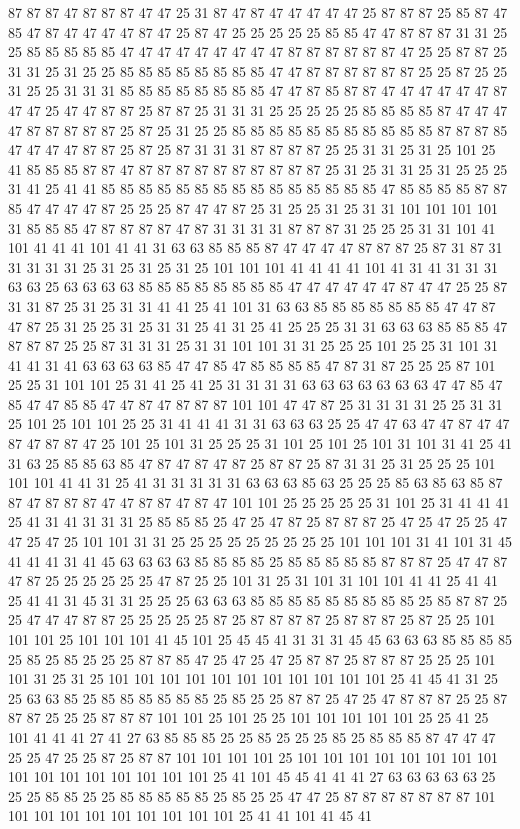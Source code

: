 87 87 87 47 87 87 87 47 47 25 31 87 47 87 47 47 47 47 47 25 87 87 87 25 85 87 47 85 47 87 47 47 47 47 87 47 25 87 47 25 25 25 25 25 85 85 47 47 87 87 87 31 31 25 25 85 85 85 85 85 47 47 47 47 47 47 47 47 47 87 87 87 87 87 87 47 25 25 87 87 25 31 31 25 31 25 25 85 85 85 85 85 85 85 85 47 47 87 87 87 87 87 87 25 25 87 25 25 31 25 25 31 31 31 85 85 85 85 85 85 85 85 47 47 87 85 87 87 47 47 47 47 47 47 87 47 47 25 47 47 87 87 25 87 87 25 31 31 31 25 25 25 25 25 85 85 85 85 87 47 47 47 47 87 87 87 87 87 25 87 25 31 25 25 85 85 85 85 85 85 85 85 85 85 85 87 87 87 85 47 47 47 47 87 87 25 87 25 87 31 31 31 87 87 87 87 25 25 31 31 25 31 25 101 25 41 85 85 85 87 87 47 87 87 87 87 87 87 87 87 87 87 25 31 25 31 31 25 31 25 25 25 31 41 25 41 41 85 85 85 85 85 85 85 85 85 85 85 85 85 85 85 47 85 85 85 85 87 87 85 47 47 47 47 87 25 25 25 87 47 47 87 25 31 25 25 31 25 31 31 101 101 101 101 31 85 85 85 47 87 87 87 87 47 87 31 31 31 31 87 87 87 31 25 25 25 31 31 101 41 101 41 41 41 101 41 41 31 63 63 85 85 85 87 47 47 47 47 87 87 87 25 87 31 87 31 31 31 31 31 25 31 25 31 25 31 25 101 101 101 41 41 41 41 101 41 31 41 31 31 31 63 63 25 63 63 63 63 85 85 85 85 85 85 85 85 47 47 47 47 47 47 87 47 47 25 25 87 31 31 87 25 31 25 31 31 41 41 25 41 101 31 63 63 85 85 85 85 85 85 85 47 47 87 47 87 25 31 25 25 31 25 31 31 25 41 31 25 41 25 25 25 31 31 63 63 63 85 85 85 47 87 87 87 25 25 87 31 31 31 25 31 31 101 101 31 31 25 25 25 101 25 25 31 101 31 41 41 31 41 63 63 63 63 85 47 47 85 47 85 85 85 85 47 87 31 87 25 25 25 87 101 25 25 31 101 101 25 31 41 25 41 25 31 31 31 31 63 63 63 63 63 63 63 47 47 85 47 85 47 47 85 85 47 47 87 47 87 87 87 101 101 47 47 87 25 31 31 31 31 25 25 31 31 25 101 25 101 101 25 25 31 41 41 41 31 31 63 63 63 25 25 47 47 63 47 47 87 47 47 87 47 87 87 47 25 101 25 101 31 25 25 25 31 101 25 101 25 101 31 101 31 41 25 41 31 63 25 85 85 63 85 47 87 47 87 47 87 25 87 87 25 87 31 31 25 31 25 25 25 101 101 101 41 41 31 25 41 31 31 31 31 31 63 63 63 85 63 25 25 25 85 63 85 63 85 87 87 47 87 87 87 47 47 87 87 47 87 47 101 101 25 25 25 25 25 31 101 25 31 41 41 41 25 41 31 41 31 31 31 25 85 85 85 25 47 25 47 87 25 87 87 87 25 47 25 47 25 25 47 47 25 47 25 101 101 31 31 25 25 25 25 25 25 25 25 25 101 101 101 31 41 101 31 45 41 41 41 31 41 45 63 63 63 63 85 85 85 85 25 85 85 85 85 85 87 87 87 25 47 47 87 47 87 25 25 25 25 25 25 47 87 25 25 101 31 25 31 101 31 101 101 41 41 25 41 41 25 41 41 31 45 31 31 25 25 25 63 63 63 85 85 85 85 85 85 85 85 85 25 85 87 87 25 25 47 47 47 87 87 25 25 25 25 25 87 25 87 87 87 87 25 87 87 87 25 87 25 25 101 101 101 25 101 101 101 41 45 101 25 45 45 41 31 31 31 45 45 63 63 63 85 85 85 85 25 85 25 85 25 25 25 87 87 85 47 25 47 25 47 25 87 87 25 87 87 87 25 25 25 101 101 31 25 31 25 101 101 101 101 101 101 101 101 101 101 101 25 41 45 41 31 25 25 63 63 85 25 85 85 85 85 85 85 25 85 25 25 87 87 25 47 25 47 87 87 87 25 25 87 87 87 25 25 25 87 87 87 101 101 25 101 25 25 101 101 101 101 101 25 25 41 25 101 41 41 41 27 41 27 63 85 85 85 25 25 85 25 25 25 85 25 85 85 85 87 47 47 47 25 25 47 25 25 87 25 87 87 101 101 101 101 25 101 101 101 101 101 101 101 101 101 101 101 101 101 101 101 101 25 41 101 45 45 41 41 41 27 63 63 63 63 63 25 25 25 85 85 25 25 85 85 85 85 85 25 85 25 25 47 47 25 87 87 87 87 87 87 87 101 101 101 101 101 101 101 101 101 101 25 41 41 101 41 45 41 